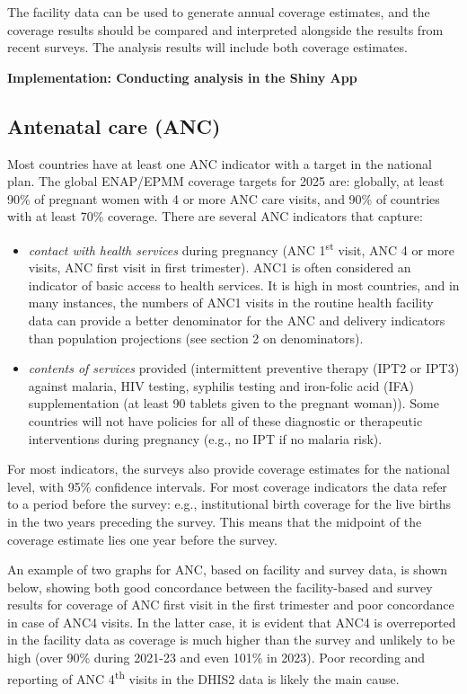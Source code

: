 \documentclass[
  english,
  letterpaper,
  DIV=11,
  numbers=noendperiod]{scrreprt}
\begin{document}
The facility data can be used to generate annual coverage estimates, and
the coverage results should be compared and interpreted alongside the
results from recent surveys. The analysis results will include both
coverage estimates.

\textbf{Implementation: Conducting analysis in the Shiny App}

\subsection{Antenatal care (ANC)}\label{sec-nat-cov-anc}

Most countries have at least one ANC indicator with a target in the
national plan. The global ENAP/EPMM coverage targets for 2025 are:
globally, at least 90\% of pregnant women with 4 or more ANC care
visits, and 90\% of countries with at least 70\% coverage. There are
several ANC indicators that capture:

\begin{itemize}
\item
  \emph{contact with health services} during pregnancy (ANC
  1\textsuperscript{st} visit, ANC 4 or more visits, ANC first visit in
  first trimester). ANC1 is often considered an indicator of basic
  access to health services. It is high in most countries, and in many
  instances, the numbers of ANC1 visits in the routine health facility
  data can provide a better denominator for the ANC and delivery
  indicators than population projections (see section 2 on
  denominators).
\item
  \emph{contents of services} provided (intermittent preventive therapy
  (IPT2 or IPT3) against malaria, HIV testing, syphilis testing and
  iron-folic acid (IFA) supplementation (at least 90 tablets given to
  the pregnant woman)). Some countries will not have policies for all of
  these diagnostic or therapeutic interventions during pregnancy (e.g.,
  no IPT if no malaria risk).
\end{itemize}

For most indicators, the surveys also provide coverage estimates for the
national level, with 95\% confidence intervals. For most coverage
indicators the data refer to a period before the survey: e.g.,
institutional birth coverage for the live births in the two years
preceding the survey. This means that the midpoint of the coverage
estimate lies one year before the survey.

An example of two graphs for ANC, based on facility and survey data, is
shown below, showing both good concordance between the facility-based
and survey results for coverage of ANC first visit in the first
trimester and poor concordance in case of ANC4 visits. In the latter
case, it is evident that ANC4 is overreported in the facility data as
coverage is much higher than the survey and unlikely to be high (over
90\% during 2021-23 and even 101\% in 2023). Poor recording and
reporting of ANC 4\textsuperscript{th} visits in the DHIS2 data is
likely the main cause.
\end{document}
